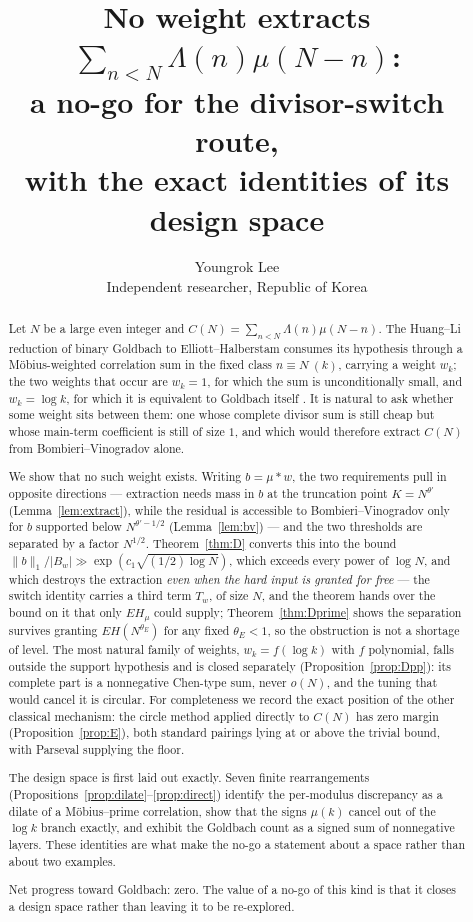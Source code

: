 \documentclass[11pt,a4paper]{article}
\title{No weight extracts $\sum_{n<N}\Lambda(n)\mu(N-n)$:\\
a no-go for the divisor-switch route,\\
with the exact identities of its design space}
\author{Youngrok Lee\\
\small Independent researcher, Republic of Korea}
\date{}
\theoremstyle{plain}
\theoremstyle{definition}
\theoremstyle{remark}
\begin{document}
\maketitle

\begin{abstract}
Let $N$ be a large even integer and
$C(N)=\sum_{n<N}\Lambda(n)\mu(N-n)$. The Huang--Li reduction of binary
Goldbach to Elliott--Halberstam \cite{HL} consumes its hypothesis
through a M\"obius-weighted correlation sum in the fixed class
$n\equiv N\ (k)$, carrying a weight $w_k$; the two weights that occur
are $w_k=1$, for which the sum is unconditionally small, and
$w_k=\log k$, for which it is equivalent to Goldbach itself
\cite{P1}. It is natural to ask whether some weight sits between them:
one whose complete divisor sum is still cheap but whose main-term
coefficient is still of size $1$, and which would therefore extract
$C(N)$ from Bombieri--Vinogradov alone.

We show that no such weight exists. Writing $b=\mu*w$, the two
requirements pull in opposite directions --- extraction needs mass in
$b$ at the truncation point $K=N^{\theta'}$
(Lemma~\ref{lem:extract}), while the residual is accessible to
Bombieri--Vinogradov only for $b$ supported below $N^{\theta'-1/2}$
(Lemma~\ref{lem:bv}) --- and the two thresholds are separated by a
factor $N^{1/2}$. Theorem~\ref{thm:D} converts this into the bound
$\|b\|_1/|B_w|\gg\exp(c_1\sqrt{(1/2)\log N})$, which exceeds every
power of $\log N$, and which destroys the extraction \emph{even when
the hard input is granted for free} --- the switch identity carries a
third term $T_w$, of size $N$, and the theorem hands over the bound on
it that only $EH_\mu$ could supply;
Theorem~\ref{thm:Dprime} shows the separation
survives granting $EH(N^{\theta_E})$ for any fixed $\theta_E<1$, so
the obstruction is not a shortage of level. The most natural family of
weights, $w_k=f(\log k)$ with $f$ polynomial, falls outside the
support hypothesis and is closed separately
(Proposition~\ref{prop:Dpp}): its complete part is a nonnegative
Chen-type sum, never $o(N)$, and the tuning that would cancel it is
circular. For completeness we record the exact position of the other
classical mechanism: the circle method applied directly to $C(N)$ has
zero margin (Proposition~\ref{prop:E}), both standard pairings lying
at or above the trivial bound, with Parseval supplying the floor.

The design space is first laid out exactly. Seven finite rearrangements
(Propositions~\ref{prop:dilate}--\ref{prop:direct}) identify the
per-modulus discrepancy as a dilate of a M\"obius--prime correlation,
show that the signs $\mu(k)$ cancel out of the $\log k$ branch
exactly, and exhibit the Goldbach count as a signed sum of
nonnegative layers. These identities are what make the no-go a
statement about a space rather than about two examples.

Net progress toward Goldbach: zero. The value of a no-go of this kind
is that it closes a design space rather than leaving it to be
re-explored.
\end{abstract}
\end{document}
